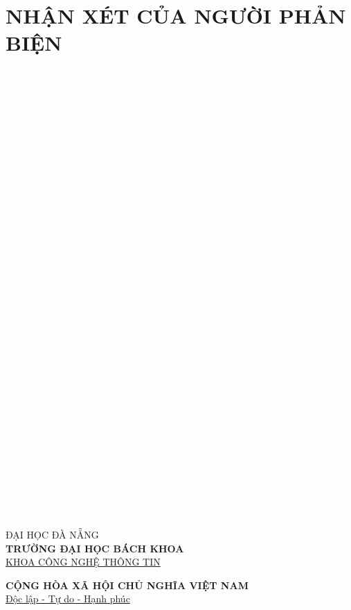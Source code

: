 \documentclass[11pt]{report}
\begin{document}
	\chapter*{NHẬN XÉT CỦA NGƯỜI PHẢN BIỆN}
	\dotfill\\\dotfill\\\dotfill\\\dotfill\\\dotfill
	\\\dotfill\\\dotfill\\\dotfill\\\dotfill\\\dotfill
	\\\dotfill\\\dotfill\\\dotfill\\\dotfill\\\dotfill
	\\\dotfill\\\dotfill\\\dotfill\\\dotfill\\\dotfill
	\\\dotfill\\\dotfill\\\dotfill\\\dotfill\\\dotfill
	\\\dotfill\\\dotfill\\\dotfill\\\dotfill\\\dotfill
	\\\dotfill\\\dotfill\\\dotfill\\
	\pagebreak
	
	
	
	
	
	\begin{minipage}[t]{.5\textwidth}
		\centering
		ĐẠI HỌC ĐÀ NẴNG\\
		\textbf{TRƯỜNG ĐẠI HỌC BÁCH KHOA}\\
		\underline{KHOA CÔNG NGHỆ THÔNG TIN}
	\end{minipage}\hfill 
	\begin{minipage}[t]{.5\textwidth}
		\centering
		\textbf{CỘNG HÒA XÃ HỘI CHỦ NGHĨA VIỆT NAM}\\
		\underline{Độc lập - Tự do - Hạnh phúc}
	\end{minipage}\\[2em]
	
\end{document}

